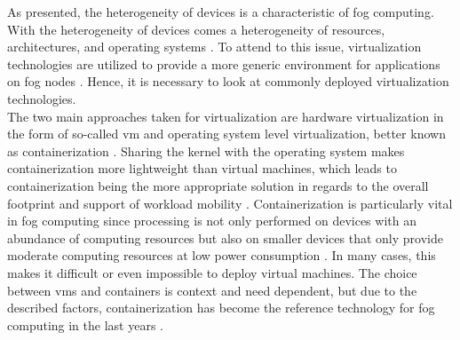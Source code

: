 As presented, the heterogeneity of devices is a characteristic of fog computing. With the heterogeneity of devices comes a heterogeneity of resources, architectures, and operating systems \cite{Puliafito.2019}. To attend to this issue, virtualization technologies are utilized to provide a more generic environment for applications on fog nodes \cite{Puliafito.2019}. Hence, it is necessary to look at commonly deployed virtualization technologies.\\
The two main approaches taken for virtualization are hardware virtualization in the form of so-called \gls{vm} and operating system level virtualization, better known as containerization \cite{Puliafito.2019}. Sharing the kernel with the operating system makes containerization more lightweight than virtual machines, which leads to containerization being the more appropriate solution in regards to the overall footprint and support of workload mobility \cite{Puliafito.2019}. Containerization is particularly vital in fog computing since processing is not only performed on devices with an abundance of computing resources but also on smaller devices that only provide moderate computing resources at low power consumption \cite{Jalali.2016}. In many cases, this makes it difficult or even impossible to deploy virtual machines. The choice between \gls{vm}s and containers is context and need dependent, but due to the described factors, containerization has become the reference technology for fog computing in the last years \cite{Puliafito.2018}.


